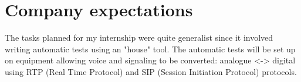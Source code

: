 \section{Company expectations}
The tasks planned for my internship were quite generalist since it
involved writing automatic tests using an "house" tool. The automatic
tests will be set up on equipment allowing voice and signaling to be
converted: analogue <-> digital using RTP (Real Time Protocol) and SIP
(Session Initiation Protocol) protocols.